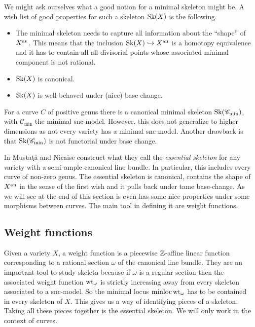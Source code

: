 We might ask ourselves what a good notion for a minimal skeleton might be. 
A wish list of good properties for such a skeleton $\operatorname{Sk}(X)$ is the following. 
\begin{itemize}
	\item The minimal skeleton needs to capture all information about the ``shape'' of $X{}^{\text{an}}$. 
		This means that the inclusion $\operatorname{Sk}(X) \hookrightarrow X{}^{\text{an}}$ is a homotopy equivalence and it has to contain all all divisorial points whose associated minimal component is not rational.
	\item $\operatorname{Sk}(X)$ is canonical. 
	\item $\operatorname{Sk}(X)$ is well behaved under (nice) base change. 
\end{itemize}
For a curve $C$ of positive genus there is a canonical minimal skeleton $\operatorname{Sk}(\mathscr C_\text{min} )$, with $\mathscr C_\text{min} $ the minimal snc-model.
However, this does not generalize to higher dimensions as not every variety has a minimal snc-model. 
Another drawback is that $\operatorname{Sk}(\mathscr C_\text{min})$ is not functorial under base change. 

In \cite{mustataWeightFunctionsNonArchimedean2015} Mustaţă and Nicaise construct what they call the \emph{essential skeleton} for any variety with a semi-ample canonical line bundle.
In particular, this includes every curve of non-zero genus. 
The essential skeleton is canonical, contains the shape of $X{}^{\text{an}}$ in the sense of the first wish and it pulls back under tame base-change. 
As we will see at the end of this section is even has some nice properties under some morphisms between curves. 
The main tool in defining it are weight functions. 

\subsection{Weight functions} \label{sec:weight_functions}
Given a variety $X$, a weight function is a piecewise $\mathbb{Z}$-affine linear function corresponding to a rational section $\omega$ of the canonical line bundle. 
They are an important tool to study skeleta because if $\omega$ is a regular section then the associated weight function $\operatorname{wt}_\omega$ is strictly increasing away from every skeleton associated to a snc-model. 
So the minimal locus $\operatorname{minloc} \operatorname{wt}_\omega$ has to be contained in every skeleton of $X$. 
This gives us a way of identifying pieces of a skeleton. 
Taking all these pieces together is the essential skeleton. 
We will only work in the context of curves. 


